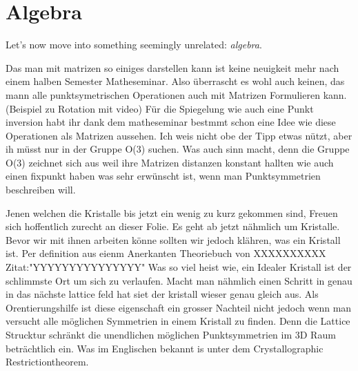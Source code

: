 \documentclass[a4paper]{article}
\newcommand{\scene}[1]{\par\noindent[ #1 ]\par}
\newenvironment{totranslate}{\color{blue!70!black}}{}
\begin{document}
\section{Algebra}
\begin{totranslate}
Let's now move into something seemingly unrelated: \emph{algebra}.
\scene{Complex numbers and cyclic groups}
\end{totranslate}

\scene{Matrizen}
  Das man mit matrizen so einiges darstellen kann ist keine neuigkeit mehr nach einem halben Semester Matheseminar. 
  Also überrascht es wohl auch keinen, das mann alle punktsymetrischen Operationen auch mit Matrizen Formulieren kann.
  (Beispiel zu Rotation mit video)
  Für die Spiegelung wie auch eine Punkt inversion habt ihr dank dem matheseminar bestmmt schon eine Idee wie diese Operationen als Matrizen aussehen.
  Ich weis nicht obe der Tipp etwas nützt, aber ih müsst nur in der Gruppe O(3) suchen. 
  Was auch sinn macht, denn die Gruppe O(3) zeichnet sich aus weil ihre Matrizen distanzen konstant hallten wie auch einen fixpunkt haben was sehr erwünscht ist, wenn man Punktsymmetrien beschreiben will.



\scene{Krystalle}
  Jenen welchen die Kristalle bis jetzt ein wenig zu kurz gekommen sind, Freuen sich hoffentlich zurecht an dieser Folie.
  Es geht ab jetzt nähmlich um Kristalle. 
  Bevor wir mit ihnen arbeiten könne sollten wir jedoch klähren, was ein Kristall ist. 
  Per definition aus eienm Anerkanten Theoriebuch von XXXXXXXXXX Zitat:"YYYYYYYYYYYYYYY"
  Was so viel  heist wie, ein Idealer Kristall ist der schlimmste Ort um sich zu verlaufen.
  Macht man nähmlich einen Schritt in genau in das nächste lattice feld hat siet der kristall wieser genau gleich aus. 
  Als Orentierungshilfe ist diese eigenschaft ein grosser Nachteil nicht jedoch wenn man versucht alle möglichen Symmetrien in einem Kristall zu finden.
  Denn die Lattice Strucktur schränkt die unendlichen möglichen Punktsymmetrien im 3D Raum beträchtlich ein. 
  Was im Englischen bekannt is unter dem Crystallographic Restrictiontheorem.  
\end{document}

